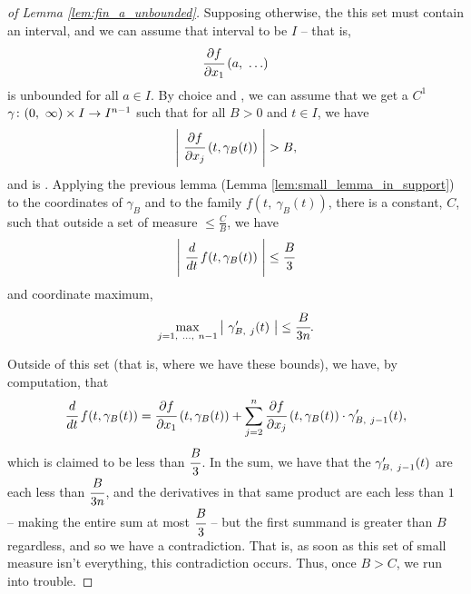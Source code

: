   \begin{proof}[of Lemma \ref{lem:fin_a_unbounded}]
    Supposing otherwise, the this set must contain an interval, and we can assume that interval to be $I$ -- that is,
      \begin{align*}
        \pderiv[f]{x_1} (a, \ \hdots)
      \end{align*}
    is unbounded for all $a \in I$. By choice and \sm, we can assume that we get a $C^1$ $\funcdom{\gamma}{(0, \ \infty) \times I}{I^{n - 1}}$ such that for all $B > 0$ and $t \in I$, we have
      \begin{align*}
        \lvrv{ \pderiv[f]{x_j} (t, \gamma_B(t)) } > B,
      \end{align*}
    and is . Applying the previous lemma (Lemma \ref{lem:small_lemma_in_support}) to the coordinates of $\gamma_B$ and to the family $f(t, \ \gamma_B(t))$, there is a constant, $C$, such that outside a set of measure $\leq \frac{C}{B}$, we have
      \begin{align*}
        \lvrv{ \deriv{t} f(t, \gamma_{B}(t)) } \leq \cfrac{B}{3}
      \end{align*}
    and coordinate maximum,
      \begin{align*}
        \max_{j = 1, \ \hdots, \ n-1} { \lvrv{ \pri{\gamma}_{B, \ j} (t) } } \leq \cfrac{B}{3n}.
      \end{align*}

    Outside of this set (that is, where we have these bounds), we have, by computation, that
      \begin{align*}
        \deriv{t} f(t, \gamma_B(t)) = \pderiv[f]{x_1} (t, \gamma_B(t)) + \sum_{j=2}^{n} \pderiv[f]{x_j} (t, \gamma_B(t)) \cdot \pri{\gamma}_{B, \ j-1} (t),
      \end{align*}
    which is claimed to be less than $\cfrac{B}{3}$. In the sum, we have that the $\pri{\gamma}_{B, \ j-1}(t)$ are each less than $\cfrac{B}{3n}$, and the derivatives in that same product are each less than $1$ -- making the entire sum at most $\cfrac{B}{3}$ -- but the first summand is greater than $B$ regardless, and so we have a contradiction. That is, as soon as this set of small measure isn't everything, this contradiction occurs. Thus, once $B > C$, we run into trouble.
  \end{proof}

